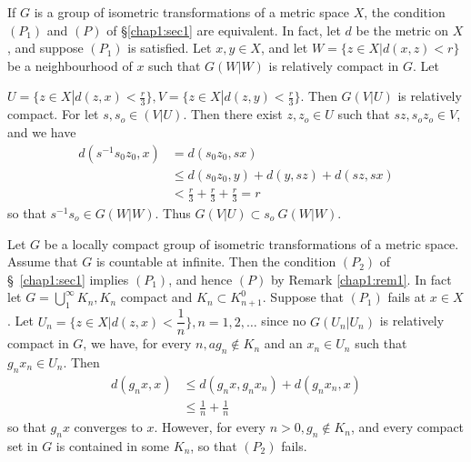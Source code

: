 \setcounter{rem}{0}
\begin{rem}\label{chap1:rem1}%
  If $G$ is a group of isometric transformations of a metric space
  $X$,   the condition $(P_1)$ and $(P)$ of \S \ref{chap1:sec1} are
  equivalent. In fact, 
  let\pageoriginale 
  $d$ be the metric on $X$, and suppose $(P_1)$ is satisfied.  Let $x, y
  \in X$, and let $W=\{z \in X | d(x, z)< r\}$ be a neighbourhood of $x$
  such that $G(W | W)$ is relatively compact in $G$. Let 
  
  $U=\{z \in X | d(z, x) < \frac{r}{3}\}, V = \{ z \in X | d (z, y)<
  \frac{r}{3} \}$. Then $G(V | U)$ is relatively compact. For let $s,
  s_o \in (V |U)$. Then there exist $z, z_o \in U$ such that $sz, s_o
  z_o \in V$, and we have 
  \begin{align*}
    d(s^{-1}s_0z_0,x) &=d(s_0z_0, sx)\\
    &\leq d(s_0 z_0, y)+d(y, sz)+d(sz, sx)\\
    &<\frac{r}{3}+\frac{r}{3}+\frac{r}{3}=r
  \end{align*} 
  so that $s^{-1}s_o \in G(W | W)$. Thus $G(V | U)\subset s_o ~ G(W | W)$.
\end{rem}

\begin{rem}%
  Let $G$ be a locally compact group of isometric transformations of a
  metric space. Assume that $G$ is countable at infinite. Then the
  condition $(P_2)$ of \S\ \ref{chap1:sec1} implies $(P_1)$, and hence
  $(P)$ by Remark 
  \ref{chap1:rem1}. In fact let $G=\bigcup^{\infty}_{1}K_n, K_n$ compact and $K_n
  \subset K^0_{n+1}$. Suppose that $(P_1)$ fails at $x \in X$. Let $U_n=
  \{ z \in X | d (z, x)< \dfrac{1}{n}\}, n=1,2, \ldots $ since no $G(U_n
  |U_n)$ is relatively compact in $G$, we have, for every $n, a g_n
  \notin K_n$  and an $x_n \in U_n$ such that $g_n x_n \in U_n$. Then 
  \begin{align*}
    d(g_n x, x) &\leq d(g_nx, g_n x_n)+d(g_n x_n, x)\\
    &\leq \frac{1}{n}+\frac{1}{n}
  \end{align*} 
  so that $g_nx$ converges to $x$. However, for every $n > 0,g_n \notin
  K_n$, and every compact set in $G$ is contained in some $K_n$, so
  that $(P_2)$ fails. 
\end{rem}
